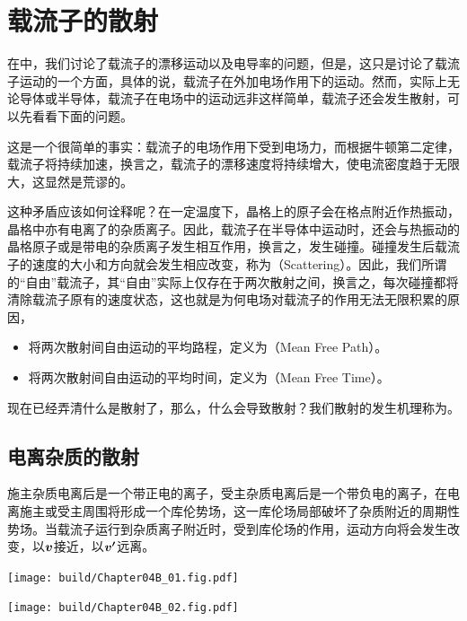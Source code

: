 \section{载流子的散射}
在中，我们讨论了载流子的漂移运动以及电导率的问题，但是，这只是讨论了载流子运动的一个方面，具体的说，载流子在外加电场作用下的运动。然而，实际上无论导体或半导体，载流子在电场中的运动远非这样简单，载流子还会发生散射，可以先看看下面的问题。

这是一个很简单的事实：载流子的电场作用下受到电场力，而根据牛顿第二定律，载流子将持续加速，换言之，载流子的漂移速度将持续增大，使电流密度趋于无限大，这显然是荒谬的。

这种矛盾应该如何诠释呢？在一定温度下，晶格上的原子会在格点附近作热振动，晶格中亦有电离了的杂质离子。因此，载流子在半导体中运动时，还会与热振动的晶格原子或是带电的杂质离子发生相互作用，换言之，发生碰撞。碰撞发生后载流子的速度的大小和方向就会发生相应改变，称为（Scattering）。因此，我们所谓的“自由”载流子，其“自由”实际上仅存在于两次散射之间，换言之，每次碰撞都将清除载流子原有的速度状态，这也就是为何电场对载流子的作用无法无限积累的原因，
\begin{itemize}
    \item 将两次散射间自由运动的平均路程，定义为（Mean Free Path）。
    \item 将两次散射间自由运动的平均时间，定义为（Mean Free Time）。
\end{itemize}
现在已经弄清什么是散射了，那么，什么会导致散射？我们散射的发生机理称为。

\subsection{电离杂质的散射}
施主杂质电离后是一个带正电的离子，受主杂质电离后是一个带负电的离子，在电离施主或受主周围将形成一个库伦势场，这一库伦场局部破坏了杂质附近的周期性势场。当载流子运行到杂质离子附近时，受到库伦场的作用，运动方向将会发生改变，以$\vb*{v}$接近，以$\vb*{v'}$远离。
\begin{Figure}[电离杂质散射]
    \begin{FigureSub}[电离施主散射]
        \texttt{[image: build/Chapter04B\_01.fig.pdf]}
    \end{FigureSub}
    \hspace{3cm}
    \begin{FigureSub}[电离受主散射]
        \texttt{[image: build/Chapter04B\_02.fig.pdf]}
    \end{FigureSub}
\end{Figure}

